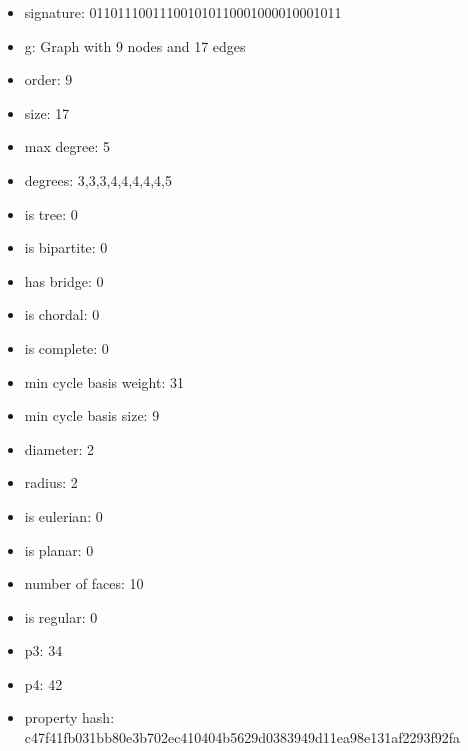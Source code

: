 \newpage
\begin{figure}
\end{figure}
\begin{itemize}
\item signature: 011011100111001010110001000010001011
\item g: Graph with 9 nodes and 17 edges
\item order: 9
\item size: 17
\item max degree: 5
\item degrees: 3,3,3,4,4,4,4,4,5
\item is tree: 0
\item is bipartite: 0
\item has bridge: 0
\item is chordal: 0
\item is complete: 0
\item min cycle basis weight: 31
\item min cycle basis size: 9
\item diameter: 2
\item radius: 2
\item is eulerian: 0
\item is planar: 0
\item number of faces: 10
\item is regular: 0
\item p3: 34
\item p4: 42
\item property hash: c47f41fb031bb80e3b702ec410404b5629d0383949d11ea98e131af2293f92fa
\end{itemize}
